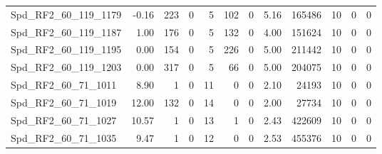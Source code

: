 \begin{longtable}[c]{@{}lrrrrrrrrrrr@{}}
Spd\_RF2\_60\_119\_1179      & -0.16                  & 223                     & 0                       & 5                      & 102                     & 0                       & 5.16                    & 165486                   & 10                       & 0                        & 0                        \\
Spd\_RF2\_60\_119\_1187      & 1.00                   & 176                     & 0                       & 5                      & 132                     & 0                       & 4.00                    & 151624                   & 10                       & 0                        & 0                        \\
Spd\_RF2\_60\_119\_1195      & 0.00                   & 154                     & 0                       & 5                      & 226                     & 0                       & 5.00                    & 211442                   & 10                       & 0                        & 0                        \\
Spd\_RF2\_60\_119\_1203      & 0.00                   & 317                     & 0                       & 5                      & 66                      & 0                       & 5.00                    & 204075                   & 10                       & 0                        & 0                        \\
Spd\_RF2\_60\_71\_1011       & 8.90                   & 1                       & 0                       & 11                     & 0                       & 0                       & 2.10                    & 24193                    & 10                       & 0                        & 0                        \\
Spd\_RF2\_60\_71\_1019       & 12.00                  & 132                     & 0                       & 14                     & 0                       & 0                       & 2.00                    & 27734                    & 10                       & 0                        & 0                        \\
Spd\_RF2\_60\_71\_1027       & 10.57                  & 1                       & 0                       & 13                     & 1                       & 0                       & 2.43                    & 422609                   & 10                       & 0                        & 0                        \\
Spd\_RF2\_60\_71\_1035       & 9.47                   & 1                       & 0                       & 12                     & 0                       & 0                       & 2.53                    & 455376                   & 10                       & 0                        & 0                        \\

\end{longtable}
